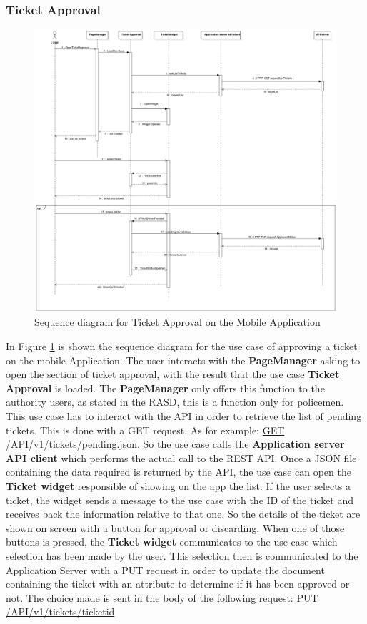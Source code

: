 \subsubsection{Ticket Approval}%
\begin{figure}[H]
\centering
\includegraphics[width=\textwidth]{Images/DDSeqAppTick.png}
\caption{\label{fig:DDSeqAppTick} Sequence diagram for Ticket Approval on the Mobile Application}
\end{figure}
In Figure \ref{fig:DDSeqAppTick} is shown the sequence diagram for the use case of approving a ticket on the mobile Application.
The user interacts with the \textbf{PageManager} asking to open the section of ticket approval, with the result that the use case \textbf{Ticket Approval} is loaded. The \textbf{PageManager} only offers this function to the authority users, as stated in the RASD, this is a function only for policemen. This use case has to interact with the API in order to retrieve the list of pending tickets. This is done with a GET request. As for example: \url{GET} \url{/API/v1/tickets/pending.json}. So the use case calls the \textbf{Application server API client} which performs the actual call to the REST API. Once a JSON file containing the data required is returned by the API, the use case can open the \textbf{Ticket widget} responsible of showing on the app the list.
If the user selects a ticket, the widget sends a message to the use case with the ID of the ticket and receives back the information relative to that one. So the details of the ticket are shown on screen with a button for approval or discarding. When one of those buttons is pressed, the \textbf{Ticket widget} communicates to the use case which selection has been made by the user. This selection then is communicated to the Application Server with a PUT request in order to update the document containing the ticket with an attribute to determine if it has been approved or not. The choice made is sent in the body of the following request: \url{PUT} \url{/API/v1/tickets/ticketid}
